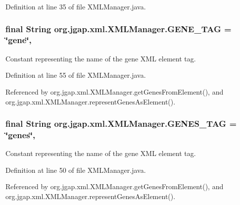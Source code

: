 Definition at line 35 of file X\-M\-L\-Manager.\-java.

\hypertarget{classorg_1_1jgap_1_1xml_1_1_x_m_l_manager_ad87772071a8f4c4182e98c5db25fdb3a}{
\subsubsection[{G\-E\-N\-E\-\_\-\-T\-A\-G}]{\setlength{\rightskip}{0pt plus 5cm}final String org.\-jgap.\-xml.\-X\-M\-L\-Manager.\-G\-E\-N\-E\-\_\-\-T\-A\-G = \char`\"{}gene\char`\"{}\hspace{0.3cm}{\ttfamily [static]}, {\ttfamily [private]}}}\label{classorg_1_1jgap_1_1xml_1_1_x_m_l_manager_ad87772071a8f4c4182e98c5db25fdb3a}
Constant representing the name of the gene X\-M\-L element tag. 

Definition at line 55 of file X\-M\-L\-Manager.\-java.



Referenced by org.\-jgap.\-xml.\-X\-M\-L\-Manager.\-get\-Genes\-From\-Element(), and org.\-jgap.\-xml.\-X\-M\-L\-Manager.\-represent\-Genes\-As\-Element().

\hypertarget{classorg_1_1jgap_1_1xml_1_1_x_m_l_manager_a40c3dda632d4fd1e9cd66265ad6af0d1}{
\subsubsection[{G\-E\-N\-E\-S\-\_\-\-T\-A\-G}]{\setlength{\rightskip}{0pt plus 5cm}final String org.\-jgap.\-xml.\-X\-M\-L\-Manager.\-G\-E\-N\-E\-S\-\_\-\-T\-A\-G = \char`\"{}genes\char`\"{}\hspace{0.3cm}{\ttfamily [static]}, {\ttfamily [private]}}}\label{classorg_1_1jgap_1_1xml_1_1_x_m_l_manager_a40c3dda632d4fd1e9cd66265ad6af0d1}
Constant representing the name of the gene X\-M\-L element tag. 

Definition at line 50 of file X\-M\-L\-Manager.\-java.



Referenced by org.\-jgap.\-xml.\-X\-M\-L\-Manager.\-get\-Genes\-From\-Element(), and org.\-jgap.\-xml.\-X\-M\-L\-Manager.\-represent\-Genes\-As\-Element().

